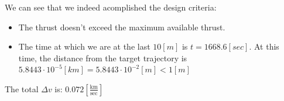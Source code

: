 \documentclass[11pt, a4paper]{article}
\begin{document}
We can see that we indeed acomplished the design criteria:
\begin{itemize}
    \item The thrust doesn't exceed the maximum available thrust.
    \item The time at which we are at the last $10[m]$ is $t=1668.6[sec]$. At this time, the distance from the target trajectory is $5.8443\cdot10^{-5}[km]=5.8443\cdot10^{-2}[m]<1[m]$ 
    
\end{itemize}

The total $\Delta v$ is: $0.072\left[\displaystyle\frac{\mathrm{km}}{\mathrm{sec}}\right]$
\end{document}

